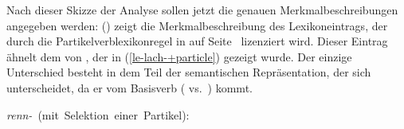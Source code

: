 Nach dieser Skizze der Analyse sollen jetzt die genauen Merkmalbeschreibungen angegeben werden:
() zeigt die Merkmalbeschreibung des Lexikoneintrags, der durch die Partikelverblexikonregel
in  auf Seite~\pageref{lr-pv} lizenziert wird. Dieser Eintrag ähnelt dem von , 
der in (\ref{le-lach-+particle}) gezeigt wurde. Der einzige Unterschied besteht
in dem Teil der semantischen Repräsentation, der sich unterscheidet,
da er vom Basisverb ( vs.\ ) kommt.

\newsavebox{\boxxcompfuenf}
\eas
\label{le-renn-+particle}
\mbox{\emph{renn-} (mit Selektion einer Partikel):}\\
\zs
%

